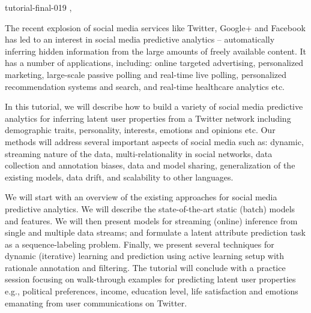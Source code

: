 \begin{tutorial}
  {tutorial-final-019}
  {\daydateyear, \tutorialafternoontime}
  {\TutLocD}

  The recent explosion of social media services like Twitter, Google+
  and Facebook has led to an interest in social media predictive
  analytics – automatically inferring hidden information from the
  large amounts of freely available content. It has a number of
  applications, including: online targeted advertising, personalized
  marketing, large-scale passive polling and real-time live polling,
  personalized recommendation systems and search, and real-time
  healthcare analytics etc.

  In this tutorial, we will describe how to build a variety of social
  media predictive analytics for inferring latent user properties from
  a Twitter network including demographic traits, personality,
  interests, emotions and opinions etc. Our methods will address
  several important aspects of social media such as: dynamic,
  streaming nature of the data, multi-relationality in social
  networks, data collection and annotation biases, data and model
  sharing, generalization of the existing models, data drift, and
  scalability to other languages.

  We will start with an overview of the existing approaches for social
  media predictive analytics. We will describe the state-of-the-art
  static (batch) models and features. We will then present models for
  streaming (online) inference from single and multiple data streams;
  and formulate a latent attribute prediction task as a
  sequence-labeling problem. Finally, we present several techniques
  for dynamic (iterative) learning and prediction using active
  learning setup with rationale annotation and filtering. The tutorial
  will conclude with a practice session focusing on walk-through
  examples for predicting latent user properties e.g., political
  preferences, income, education level, life satisfaction and emotions
  emanating from user communications on Twitter.

\end{tutorial}
